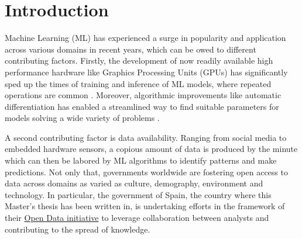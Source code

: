 \documentclass[12pt]{report} %
\begin{document}

\setcounter{page}{5}


\vfill

\newpage %
\thispagestyle{empty}
\mbox{}



\tableofcontents
\thispagestyle{fancy}

\newpage %
\thispagestyle{empty}
\mbox{}

\listoffigures
\thispagestyle{fancy}

\newpage %
\thispagestyle{empty}
\mbox{}

\listoftables
\thispagestyle{fancy}

\newpage %
\thispagestyle{empty}
\mbox{}


\clearpage
{} %

\chapter{Introduction}

Machine Learning (ML) has experienced a surge in popularity and application across various
domains in recent years, which can be owed to different contributing factors.
Firstly, the development of now readily available high performance hardware like
Graphics Processing Units (GPUs) has significantly sped up the times of training
and inference of ML models, where
repeated operations are common \cite{oh2004gpu}.
Moreover, algorithmic improvements like automatic differentiation has enabled a streamlined
way to find suitable parameters for models solving a wide variety of problems
\cite{baydin2018automatic}.

A second contributing factor is data availability. Ranging from social media to embedded hardware sensors, a copious amount of data is produced by the minute which can then be labored by ML algorithms to identify patterns and
make predictions. Not only that, governments worldwide are fostering open access to
data across domains as varied as culture, demography, environment and technology.
In particular, the government of Spain, the country where this Master's thesis has been
written in, is undertaking efforts in the framework of their
\href{https://datos.gob.es/en}{Open Data initiative} to leverage collaboration between
analysts and contributing to the spread of knowledge.
\end{document}
